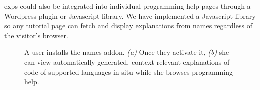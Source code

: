 \begin{changes}
\Glspl{exp} could also be integrated into individual programming help pages through a Wordpress plugin or Javascript library.
We have implemented a Javascript library so any tutorial page can fetch and display explanations from \Glspl{name} regardless of the visitor's browser.
\end{changes}

\begin{figure}
    \centering
    \label{fig:browser_tutorons_markup}
    \caption{A user installs the \Glspl{name} addon.  \emph{(a)} Once they activate it, \emph{(b)} she can view automatically-generated, context-relevant explanations of code of supported languages in-situ while she browses programming help.}
\end{figure}
\fi

